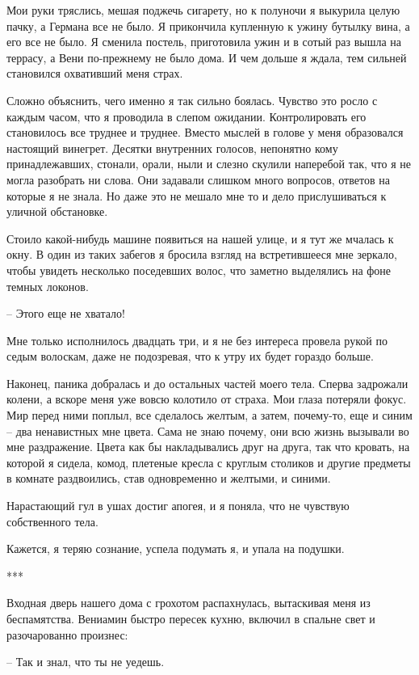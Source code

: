 \documentclass[
]{book}
\begin{document}
Мои руки тряслись, мешая поджечь сигарету, но к полуночи я выкурила целую пачку, а Германа все не было. Я прикончила купленную к ужину бутылку вина, а его все не было. Я сменила постель, приготовила ужин и в сотый раз вышла на террасу, а Вени по-прежнему не было дома. И чем дольше я ждала, тем сильней становился охвативший меня страх.

Сложно объяснить, чего именно я так сильно боялась. Чувство это росло с каждым часом, что я проводила в слепом ожидании. Контролировать его становилось все труднее и труднее. Вместо мыслей в голове у меня образовался настоящий винегрет. Десятки внутренних голосов, непонятно кому принадлежавших, стонали, орали, ныли и слезно скулили наперебой так, что я не могла разобрать ни слова. Они задавали слишком много вопросов, ответов на которые я не знала. Но даже это не мешало мне то и дело прислушиваться к уличной обстановке.

Стоило какой-нибудь машине появиться на нашей улице, и я тут же мчалась к окну. В один из таких забегов я бросила взгляд на встретившееся мне зеркало, чтобы увидеть несколько поседевших волос, что заметно выделялись на фоне темных локонов.

-- Этого еще не хватало!

Мне только исполнилось двадцать три, и я не без интереса провела рукой по седым волоскам, даже не подозревая, что к утру их будет гораздо больше.

Наконец, паника добралась и до остальных частей моего тела. Сперва задрожали колени, а вскоре меня уже вовсю колотило от страха. Мои глаза потеряли фокус. Мир перед ними поплыл, все сделалось желтым, а затем, почему-то, еще и синим -- два ненавистных мне цвета. Сама не знаю почему, они всю жизнь вызывали во мне раздражение. Цвета как бы накладывались друг на друга, так что кровать, на которой я сидела, комод, плетеные кресла с круглым столиков и другие предметы в комнате раздвоились, став одновременно и желтыми, и синими.

Нарастающий гул в ушах достиг апогея, и я поняла, что не чувствую собственного тела.

Кажется, я теряю сознание, успела подумать я, и упала на подушки.

***

Входная дверь нашего дома с грохотом распахнулась, вытаскивая меня из беспамятства. Вениамин быстро пересек кухню, включил в спальне свет и разочарованно произнес:

-- Так и знал, что ты не уедешь.
\end{document}
